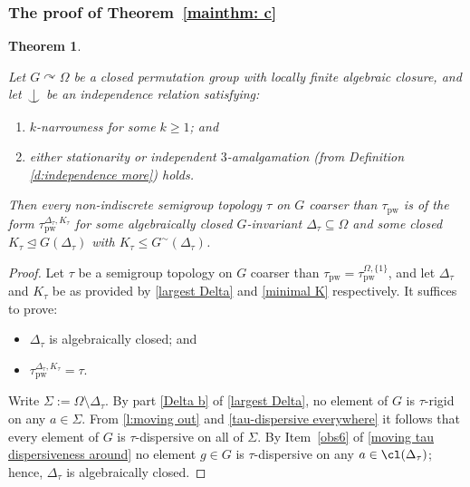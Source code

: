 \documentclass{article}
\newtheorem{theorem}{Theorem}[section]
\theoremstyle{remark}
\theoremstyle{definition}
\def\acts{\curvearrowright}
\newcommand{\pw}[0]{\tau_{\mathrm{pw}}}
\def\Ind#1#2{#1\setbox0=\hbox{$#1x$}\kern\wd0\hbox to 0pt{\hss$#1\mid$\hss}
	\lower.9\ht0\hbox to 0pt{\hss$#1\smile$\hss}\kern\wd0}
\def\ind{\mathop{\mathpalette\Ind{}}}
\renewcommand\leq{\leqslant}
\renewcommand\geq{\geqslant}
\newcommand{\gc}[0]{G^{\sim}}
\begin{document}
{{{{{  
\subsubsection{The proof of Theorem~\ref{mainthm: c}}




   
\begin{theorem}\label{thm:onebased} %

Let $G\acts\Omega$ be a closed permutation group with locally finite algebraic closure, and let $\ind$ be an independence relation satisfying:
	\begin{enumerate}[label=(\Roman*)]
        \item {$k$-narrowness for some $k\geq 1$; and}
		\item either stationarity or  independent $3$-amalgamation (from Definition \ref{d:independence more}) holds. 
	\end{enumerate}
  Then every {non-indiscrete} semigroup topology  $\tau$  on $G$  {coarser than} $\pw$ is {of the form $\pw^{\Delta_{\tau},K_{\tau}}$ for some {algebraically} closed $G$-invariant $\Delta_{\tau}\subseteq \Omega$ and some {closed} $K_{\tau}\unlhd G(\Delta_\tau)$ with $K_\tau\leq {\gc}(\Delta_\tau)$}.
  
\end{theorem}
\begin{proof}
  Let $\tau$ be a semigroup topology on $G$ coarser than $\pw = \pw^{\Omega, \{1\}}$, and let $\Delta_\tau$ and $K_\tau$ be as provided by \cref{largest Delta}
  and \cref{minimal K} respectively. It  suffices to prove:
  
  \begin{itemize}
     \item $\Delta_{\tau}$ is algebraically closed; and
     \item $\pw^{\Delta_{\tau},K_{\tau}}=\tau$.
  \end{itemize}

  
  Write $\Sigma:=\Omega\setminus\Delta_{\tau}$. By part \ref{Delta b} of \cref{largest Delta}, no element of $G$ is $\tau$-rigid on any $a\in \Sigma$.
  From \cref{l:moving out} and \cref{tau-dispersive everywhere} it follows that every element of $G$ is $\tau$-dispersive on all of $\Sigma$. 
  By Item~\eqref{obs6}  of \cref{moving tau dispersiveness around} no element $g\in G$ is $\tau$-dispersive on any
  $a\in\cl(\Delta_{\tau})$; hence, $\Delta_{\tau}$ is algebraically closed. 
 

\end{proof}}}}}}
\end{document}
